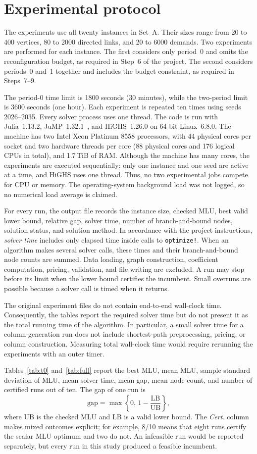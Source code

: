 \section{Experimental protocol}
\label{sec:protocol}

The experiments use all twenty instances in Set~A. Their sizes range from 20 to 400 vertices, 80 to
2000 directed links, and 20 to 6000 demands. Two experiments are performed for each instance. The
first considers only period~0 and omits the reconfiguration budget, as required in Step~6 of the
project. The second considers periods~0 and~1 together and includes the budget constraint, as
required in Steps~7--9.

The period-0 time limit is 1800 seconds (30 minutes), while the two-period limit is 3600 seconds (one
hour). Each experiment is repeated ten times using seeds 2026--2035. Every solver process uses one
thread. The code is run with Julia~1.13.2, JuMP~1.32.1~\citep{jump2017}, and HiGHS~1.26.0 on 64-bit
Linux~6.8.0. The machine has two Intel Xeon Platinum 8558 processors, with 44 physical cores per
socket and two hardware threads per core (88 physical cores and 176 logical CPUs in total), and
1.7\,TiB of RAM. Although the machine has many cores, the experiments are executed sequentially: only
one instance and one seed are active at a time, and HiGHS uses one thread. Thus, no two experimental
jobs compete for CPU or memory. The operating-system background load was not logged, so no numerical
load average is claimed.

For every run, the output file records the instance size, checked MLU, best valid lower bound,
relative gap, solver time, number of branch-and-bound nodes, solution status, and solution method. In
accordance with the project instructions, \emph{solver time} includes only elapsed time inside calls
to \texttt{optimize!}. When an algorithm makes several solver calls, these times and their
branch-and-bound node counts are summed. Data loading, graph construction, coefficient computation,
pricing, validation, and file writing are excluded. A run may stop before its limit when the lower
bound certifies the incumbent. Small overruns are possible because a solver call is timed when it
returns.

The original experiment files do not contain end-to-end wall-clock time. Consequently, the tables
report the required solver time but do not present it as the total running time of the algorithm. In
particular, a small solver time for a column-generation run does not include shortest-path
preprocessing, pricing, or column construction. Measuring total wall-clock time would require
rerunning the experiments with an outer timer.

Tables~\ref{tab:t0} and~\ref{tab:full} report the best MLU, mean MLU, sample standard deviation of
MLU, mean solver time, mean gap, mean node count, and number of certified runs out of ten. The gap of
one run is
\[
\mathrm{gap}=\max\left\{0,\,1-\frac{\mathrm{LB}}{\mathrm{UB}}\right\},
\]
where UB is the checked MLU and LB is a valid lower bound. The \emph{Cert.} column makes mixed outcomes
explicit; for example, 8/10 means that eight runs certify the scalar MLU optimum and two do not. An
infeasible run would be reported separately, but every run in this study produced a feasible
incumbent.
